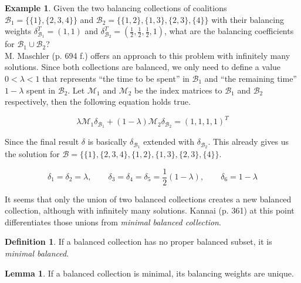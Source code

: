 \documentclass[10pt,a4paper,titlepage]{article}
\theoremstyle{plain}
\theoremstyle{definition}
\newtheorem{definition}[thm]{Definition} %
\newtheorem{example}[thm]{Example} %
\newtheorem{lemma}[thm]{Lemma}
\begin{document}
\begin{example}\label{ex:isbalanced2}
    Given the two balancing collections of coalitions $\mathcal{B}_1 = \{\{1\}, \{2, 3, 4\}\}$ and $\mathcal{B}_2 = \{\{1, 2\}, \{1, 3\}, \{2, 3\}, \{4\}\}$ with their balancing weights $\delta_{\mathcal{B}_1}^T = (1, 1)$ and $\delta_{\mathcal{B}_2}^T = (\frac{1}{2}, \frac{1}{2}, \frac{1}{2}, 1) $, what are the balancing coefficients for $\mathcal{B}_1 \cup \mathcal{B}_2$?\\

    M. Maschler\cite{maschler} (p. 694 f.) offers an approach to this problem with infinitely many solutions. Since both collections are balanced, we only need to define a value $0 < \lambda < 1$ that represents \enquote{the time to be spent} in $\mathcal{B}_1$ and \enquote{the remaining time} $1 - \lambda$ spent in $\mathcal{B}_2$. Let $\mathcal{M}_1$ and $\mathcal{M}_2$ be the index matrices to $\mathcal{B}_1$ and $\mathcal{B}_2$ respectively, then the following equation holds true.\vspace{-10pt}

    \begin{equation*}
        \lambda \mathcal{M}_1 \delta_{\mathcal{B}_1} + (1 - \lambda) \mathcal{M}_2 \delta_{\mathcal{B}_2} = (1, 1, 1, 1)^T
    \end{equation*}

    Since the final result $\delta$ is basically $\delta_{\mathcal{B}_1}$ extended with $\delta_{\mathcal{B}_2}$. This already gives us the solution for $\mathcal{B} = \{\{1\}, \{2, 3, 4\}, \{1, 2\}, \{1, 3\}, \{2, 3\}, \{4\}\}$.

    \begin{equation*}
        \delta_1 = \delta_2 = \lambda,\qquad\delta_3 = \delta_4 = \delta_5 = \frac{1}{2}(1 - \lambda),\qquad\delta_6 = 1 - \lambda
    \end{equation*}
\end{example}

It seems that only the union of two balanced collections creates a new balanced collection, although with infinitely many solutions. Kannai\cite{kannai} (p. 361) at this point differentiates those unions from \textit{minimal balanced collection}.

\begin{definition}
    If a balanced collection has no proper balanced subset, it is \textit{minimal balanced}.
\end{definition}

\begin{lemma}
    If a balanced collection is minimal, its balancing weights are unique.
\end{lemma}
\end{document}
